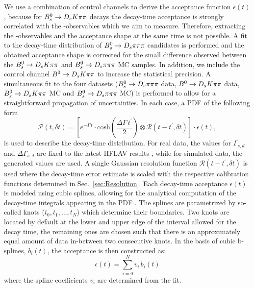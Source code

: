 We use a combination of control channels to derive the acceptance function $\epsilon(t)$, because for ${{B}^0_{s}}\rightarrow{\ensuremath{{D}_{s}}}{\ensuremath{K}}{\ensuremath{\pi}}{\ensuremath{\pi}}$ decays the decay-time acceptance is strongly correlated with the \CP-observables which we aim to measure. Therefore, extracting the \CP-observables and the acceptance shape at the same time is not possible. 
A fit to the decay-time distribution of ${{B}^0_{s}}\rightarrow{\ensuremath{{D}_{s}}}{\ensuremath{\pi}}{\ensuremath{\pi}}{\ensuremath{\pi}}$ candidates is performed and the obtained acceptance shape is corrected for the small difference 
observed between the ${{B}^0_{s}}\rightarrow{\ensuremath{{D}_{s}}}{\ensuremath{K}}{\ensuremath{\pi}}{\ensuremath{\pi}}$ and ${{B}^0_{s}}\rightarrow{\ensuremath{{D}_{s}}}{\ensuremath{\pi}}{\ensuremath{\pi}}{\ensuremath{\pi}}$ MC samples. 
In addition, we include the control channel ${{B}^0}\rightarrow{\ensuremath{{D}_{s}}}{\ensuremath{K}}{\ensuremath{\pi}}{\ensuremath{\pi}}$ to increase the statistical precision.
A simultaneous fit to the four datasets (${{B}^0_{s}}\rightarrow{\ensuremath{{D}_{s}}}{\ensuremath{\pi}}{\ensuremath{\pi}}{\ensuremath{\pi}}$ data, ${{B}^0}\rightarrow{\ensuremath{{D}_{s}}}{\ensuremath{K}}{\ensuremath{\pi}}{\ensuremath{\pi}}$ data, ${{B}^0_{s}}\rightarrow{\ensuremath{{D}_{s}}}{\ensuremath{K}}{\ensuremath{\pi}}{\ensuremath{\pi}}$ MC and ${{B}^0_{s}}\rightarrow{\ensuremath{{D}_{s}}}{\ensuremath{\pi}}{\ensuremath{\pi}}{\ensuremath{\pi}}$ MC)
is performed to allow for a straightforward propagation of uncertainties.
In each case, a PDF of the following form 
\begin{equation}
\mathcal{P}(t,\delta t) = \left[ e^{-\Gamma \, t}\cdot \text{cosh}\left(\frac{\Delta\Gamma \, t^\prime}{2}\right) \otimes \mathcal{R}(t - t^{'}, \delta t)\right] \cdot \epsilon(t),
\label{eq:AccPDF}
\end{equation}
is used to describe the decay-time distribution. 
For real data, the values for $\Gamma_{s,d}$ and $\Delta\Gamma_{s,d}$ are fixed to the latest HFLAV results \cite{HFAG},
while for simulated data, the generated values are used.
A  single Gaussian resolution function $\mathcal{R}(t - t^{'}, \delta t)$ is used where the decay-time error estimate is scaled with the respective calibration functions determined in
Sec.~\ref{sec:Resolution}.
Each decay-time acceptance $\epsilon(t)$ is modeled
using cubic splines, allowing for the analytical computation of the decay-time integrals appearing in the PDF \cite{Karbach:2014qba}.
The splines are parametrized by so-called knots ($t_0,t_1,\dots,t_N$) which determine their boundaries. 
Two knots are located by default at the lower and upper edge of the interval allowed for the decay time, the remaining ones are chosen 
such that there is an approximately equal amount of data in-between two consecutive knots.
In the basis of cubic b-splines, $b_i(t)$, the acceptance is then constructed as:
\begin{equation}   
	\epsilon(t) = \sum_{i=0}^N v_i \, b_i(t)   
	\label{eq:Spline}
\end{equation}
where the spline coefficients $v_i$ are determined from the fit.
